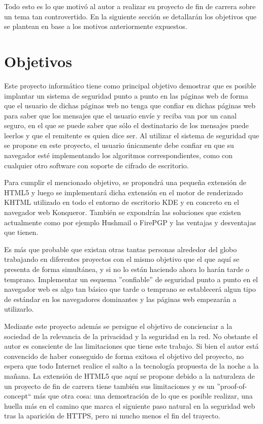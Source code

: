 Todo esto es lo que motivó al autor a realizar su proyecto de fin de carrera sobre un tema tan controvertido. En la siguiente sección se detallarán los objetivos que se plantean en base a los motivos anteriormente expuestos.

\section{Objetivos}\label{objetivos}

Este proyecto informático tiene como principal objetivo demostrar que es posible implantar un sistema de seguridad punto a punto en las páginas web de forma que el usuario de dichas páginas web no tenga que confiar en dichas páginas web para saber que los mensajes que el usuario envíe y reciba van por un canal seguro, en el que se puede saber que sólo el destinatario de los mensajes puede leerlos y que el remitente es quien dice ser. Al utilizar el sistema de seguridad que se propone en este proyecto, el usuario únicamente debe confiar en que su navegador esté implementando los algoritmos correspondientes, como con cualquier otro software con soporte de cifrado de escritorio.

Para cumplir el mencionado objetivo, se propondrá una pequeña extensión de HTML5 y luego se implementará dicha extensión en el motor de renderizado KHTML utilizado en todo el entorno de escritorio KDE y en concreto en el navegador web Konqueror. También se expondrán las soluciones que existen actualmente como por ejemplo Hushmail o FirePGP y las ventajas y desventajas que tienen.

Es más que probable que existan otras tantas personas alrededor del globo trabajando en diferentes proyectos con el mismo objetivo que el que aquí se presenta de forma simultánea, y si no lo están haciendo ahora lo harán tarde o temprano. Implementar un esquema ''confiable'' de seguridad punto a punto en el navegador web es algo tan básico que tarde o temprano se establecerá algun tipo de estándar en los navegadores dominantes y las páginas web empezarán a utilizarlo.

Mediante este proyecto además se persigue el objetivo de concienciar a la sociedad de la relevancia de la privacidad y la seguridad en la red. No obstante el autor es consciente de las limitaciones que tiene este trabajo. Si bien el autor está convencido de haber conseguido de forma exitosa el objetivo del proyecto, no espera que todo Internet realice el salto a la tecnología propuesta de la noche a la mañana. La extensión de HTML5 que aquí se propone debido a la naturaleza de un proyecto de fin de carrera tiene también sus limitaciones y es un ''proof-of-concept`` más que otra cosa: una demostración de lo que es posible realizar, una huella más en el camino que marca el siguiente paso natural en la seguridad web tras la aparición de HTTPS, pero ni mucho menos el fin del trayecto.

